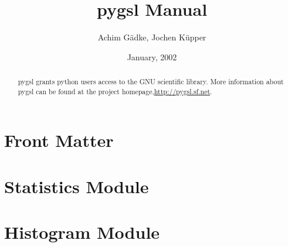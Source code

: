 \documentclass{manual}
\title{pygsl Manual}
\author{Achim G\"adke, Jochen K\"upper}
\date{January, 2002}		%
\begin{document}
\maketitle

\ifhtml
\chapter*{Front Matter\label{front}}
\fi



\begin{abstract}

\noindent
pygsl grants python users access to the GNU scientific library.
More information about pygsl can be found at the project homepage,\url{http://pygsl.sf.net}.
\end{abstract}

\tableofcontents


\chapter{Statistics Module}


\chapter{Histogram Module}



\end{document}

